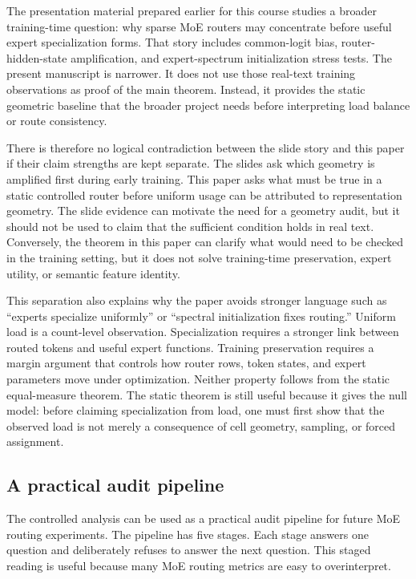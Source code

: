 The presentation material prepared earlier for this course studies a broader
training-time question: why sparse MoE routers may concentrate before useful
expert specialization forms. That story includes common-logit bias,
router-hidden-state amplification, and expert-spectrum initialization stress
tests. The present manuscript is narrower. It does not use those real-text
training observations as proof of the main theorem. Instead, it provides the
static geometric baseline that the broader project needs before interpreting
load balance or route consistency.

There is therefore no logical contradiction between the slide story and this
paper if their claim strengths are kept separate. The slides ask which geometry
is amplified first during early training. This paper asks what must be true in a
static controlled router before uniform usage can be attributed to
representation geometry. The slide evidence can motivate the need for a
geometry audit, but it should not be used to claim that the sufficient condition
holds in real text. Conversely, the theorem in this paper can clarify what
would need to be checked in the training setting, but it does not solve
training-time preservation, expert utility, or semantic feature identity.

This separation also explains why the paper avoids stronger language such as
``experts specialize uniformly'' or ``spectral initialization fixes routing.''
Uniform load is a count-level observation. Specialization requires a stronger
link between routed tokens and useful expert functions. Training preservation
requires a margin argument that controls how router rows, token states, and
expert parameters move under optimization. Neither property follows from the
static equal-measure theorem. The static theorem is still useful because it
gives the null model: before claiming specialization from load, one must first
show that the observed load is not merely a consequence of cell geometry,
sampling, or forced assignment.

\subsection{A practical audit pipeline}

The controlled analysis can be used as a practical audit pipeline for future
MoE routing experiments. The pipeline has five stages. Each stage answers one
question and deliberately refuses to answer the next question. This staged
reading is useful because many MoE routing metrics are easy to overinterpret.

